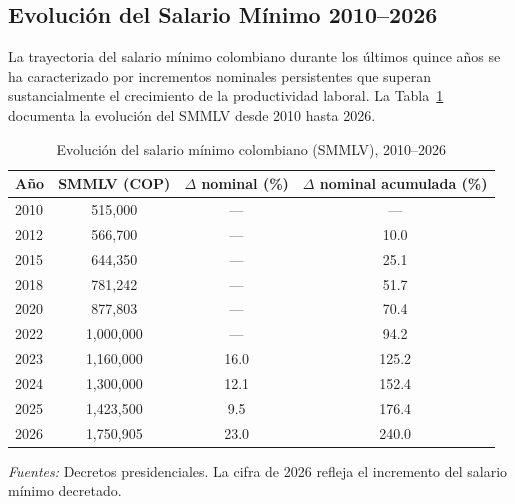 \documentclass{article}
\begin{document}
\subsection{Evoluci\'on del Salario M\'inimo 2010--2026}
\label{subsec:min_wage}

La trayectoria del salario m\'inimo colombiano durante los \'ultimos quince a\~nos se ha caracterizado por incrementos nominales persistentes que superan sustancialmente el crecimiento de la productividad laboral. La Tabla~\ref{tab:min_wage} documenta la evoluci\'on del SMMLV desde 2010 hasta 2026.

\begin{table}[htbp]
\centering
\caption{Evoluci\'on del salario m\'inimo colombiano (SMMLV), 2010--2026}
\label{tab:min_wage}
\begin{threeparttable}
\begin{tabular}{lccc}
\toprule
\textbf{A\~no} & \textbf{SMMLV (COP)} & \textbf{$\Delta$ nominal (\%)} & \textbf{$\Delta$ nominal acumulada (\%)} \\
\midrule
2010 & 515,000 & --- & --- \\
2012 & 566,700 & --- & 10.0 \\
2015 & 644,350 & --- & 25.1 \\
2018 & 781,242 & --- & 51.7 \\
2020 & 877,803 & --- & 70.4 \\
2022 & 1,000,000 & --- & 94.2 \\
2023 & 1,160,000 & 16.0 & 125.2 \\
2024 & 1,300,000 & 12.1 & 152.4 \\
2025 & 1,423,500 & 9.5 & 176.4 \\
2026 & 1,750,905 & 23.0 & 240.0 \\
\bottomrule
\end{tabular}
\begin{tablenotes}
\small
\item \textit{Fuentes:} Decretos presidenciales. La cifra de 2026 refleja el incremento del salario m\'inimo decretado.
\end{tablenotes}
\end{threeparttable}
\end{table}
\end{document}
